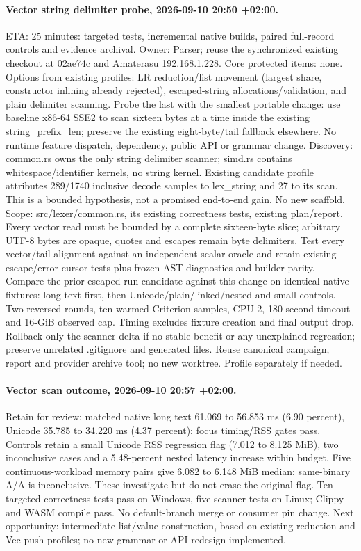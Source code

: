 \documentclass[11pt,a4paper]{article}
\begin{document}
\paragraph{Vector string delimiter probe, 2026-09-10 20:50 +02:00.}
ETA: 25 minutes: targeted tests, incremental native builds, paired full-record
controls and evidence archival. Owner: Parser; reuse the synchronized existing
checkout at 02ae74c and Amaterasu 192.168.1.228. Core protected items: none.
Options from existing profiles: LR reduction/list movement (largest share,
constructor inlining already rejected), escaped-string allocations/validation,
and plain delimiter scanning. Probe the last with the smallest portable change:
use baseline x86-64 SSE2 to scan sixteen bytes at a time inside the existing
string\_prefix\_len; preserve the existing eight-byte/tail fallback elsewhere.
No runtime feature dispatch, dependency, public API or grammar change.
Discovery: common.rs owns the only string delimiter scanner; simd.rs contains
whitespace/identifier kernels, no string kernel. Existing candidate profile
attributes 289/1740 inclusive decode samples to lex\_string and 27 to its scan.
This is a bounded hypothesis, not a promised end-to-end gain. No new scaffold.
Scope: src/lexer/common.rs, its existing correctness tests, existing plan/report.
Every vector read must be bounded by a complete sixteen-byte slice; arbitrary
UTF-8 bytes are opaque, quotes and escapes remain byte delimiters. Test every
vector/tail alignment against an independent scalar oracle and retain existing
escape/error cursor tests plus frozen AST diagnostics and builder parity.
Compare the prior escaped-run candidate against this change on identical native
fixtures: long text first, then Unicode/plain/linked/nested and small controls.
Two reversed rounds, ten warmed Criterion samples, CPU 2, 180-second timeout and
16-GiB observed cap. Timing excludes fixture creation and final output drop.
Rollback only the scanner delta if no stable benefit or any unexplained regression;
preserve unrelated .gitignore and generated files. Reuse canonical campaign,
report and provider archive tool; no new worktree. Profile separately if needed.


\paragraph{Vector scan outcome, 2026-09-10 20:57 +02:00.}
Retain for review: matched native long text 61.069 to 56.853 ms (6.90 percent),
Unicode 35.785 to 34.220 ms (4.37 percent); focus timing/RSS gates pass.
Controls retain a small Unicode RSS regression flag (7.012 to 8.125 MiB),
two inconclusive cases and a 5.48-percent nested latency increase within budget.
Five continuous-workload memory pairs give 6.082 to 6.148 MiB median; same-binary
A/A is inconclusive. These investigate but do not erase the original flag.
Ten targeted correctness tests pass on Windows, five scanner tests on Linux;
Clippy and WASM compile pass. No default-branch merge or consumer pin change.
Next opportunity: intermediate list/value construction, based on existing
reduction and Vec-push profiles; no new grammar or API redesign implemented.
\end{document}
